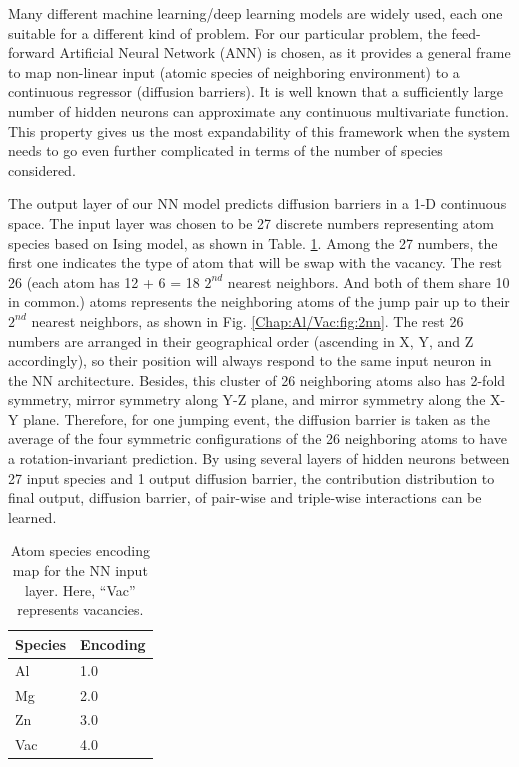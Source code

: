 Many different machine learning/deep learning models are widely used, each one suitable for a different kind of problem. \cite{bartok2010gaussian,behler2011atom,szlachta2014accuracy,artrith2016implementation,mehta2014exact,artrith2017efficient} For our particular problem, the feed-forward Artificial Neural Network (ANN) is chosen, as it provides a general frame to map non-linear input (atomic species of neighboring environment) to a continuous regressor (diffusion barriers). It is well known that a sufficiently large number of hidden neurons can approximate any continuous multivariate function. \cite{hornik1989multilayer} This property gives us the most expandability of this framework when the system needs to go even further complicated in terms of the number of species considered. 


The output layer of our \ac{NN} model predicts diffusion barriers in a 1-D continuous space. The input layer was chosen to be 27 discrete numbers representing atom species based on Ising model, as shown in Table. \ref{Chap:Al/Vac:tab:mapping}. Among the 27 numbers, the first one indicates the type of atom that will be swap with the vacancy. The rest 26 (each atom has 12 + 6 = 18 $\text{2}^{nd}$ nearest neighbors. And both of them share 10 in common.) atoms represents the neighboring atoms of the jump pair up to their $\text{2}^{nd}$ nearest neighbors, as shown in Fig. \ref{Chap:Al/Vac:fig:2nn}. The rest 26 numbers are arranged in their geographical order (ascending in X, Y, and Z accordingly), so their position will always respond to the same input neuron in the \ac{NN} architecture. Besides, this cluster of 26 neighboring atoms also has 2-fold symmetry, mirror symmetry along Y-Z plane, and mirror symmetry along the X-Y plane. Therefore, for one jumping event, the diffusion barrier is taken as the average of the four symmetric configurations of the 26 neighboring atoms to have a rotation-invariant prediction. By using several layers of hidden neurons between 27 input species and 1 output diffusion barrier, the contribution distribution to final output, diffusion barrier, of pair-wise and triple-wise interactions can be learned.


\begin{table}[!htbp]
\centering
\caption[Atom species encoding map for the \acf{NN} input layer.]{Atom species encoding map for the \acf{NN} input layer. Here, ``Vac'' represents vacancies.}
\label{Chap:Al/Vac:tab:mapping}
\begin{tabular}{ll}
\\
\hline
\hline
Species & Encoding  \\ \hline
Al & 1.0 \\
Mg & 2.0 \\
Zn & 3.0 \\
Vac & 4.0 \\
\hline
\hline
\end{tabular}
\end{table}


